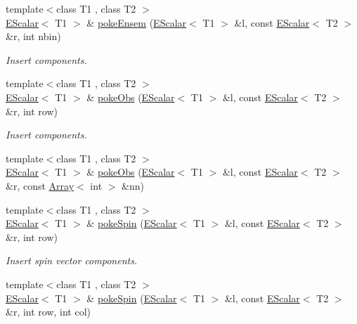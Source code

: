 \begin{DoxyCompactItemize}
\item 
{\footnotesize template$<$class T1 , class T2 $>$ }\\\mbox{\hyperlink{classENSEM_1_1EScalar}{E\+Scalar}}$<$ T1 $>$ \& \mbox{\hyperlink{group__escalar_ga9528137f2a0461bf8dc2e6825f00464f}{poke\+Ensem}} (\mbox{\hyperlink{classENSEM_1_1EScalar}{E\+Scalar}}$<$ T1 $>$ \&l, const \mbox{\hyperlink{classENSEM_1_1EScalar}{E\+Scalar}}$<$ T2 $>$ \&r, int nbin)
\begin{DoxyCompactList}\small\item\em Insert components. \end{DoxyCompactList}\item 
{\footnotesize template$<$class T1 , class T2 $>$ }\\\mbox{\hyperlink{classENSEM_1_1EScalar}{E\+Scalar}}$<$ T1 $>$ \& \mbox{\hyperlink{group__escalar_ga635de79045bc1565a78ea94b9ff967fb}{poke\+Obs}} (\mbox{\hyperlink{classENSEM_1_1EScalar}{E\+Scalar}}$<$ T1 $>$ \&l, const \mbox{\hyperlink{classENSEM_1_1EScalar}{E\+Scalar}}$<$ T2 $>$ \&r, int row)
\begin{DoxyCompactList}\small\item\em Insert components. \end{DoxyCompactList}\item 
{\footnotesize template$<$class T1 , class T2 $>$ }\\\mbox{\hyperlink{classENSEM_1_1EScalar}{E\+Scalar}}$<$ T1 $>$ \& \mbox{\hyperlink{group__escalar_gad25640d827b75330c6d3f288290866fd}{poke\+Obs}} (\mbox{\hyperlink{classENSEM_1_1EScalar}{E\+Scalar}}$<$ T1 $>$ \&l, const \mbox{\hyperlink{classENSEM_1_1EScalar}{E\+Scalar}}$<$ T2 $>$ \&r, const \mbox{\hyperlink{classXMLArray_1_1Array}{Array}}$<$ int $>$ \&nn)
\item 
{\footnotesize template$<$class T1 , class T2 $>$ }\\\mbox{\hyperlink{classENSEM_1_1EScalar}{E\+Scalar}}$<$ T1 $>$ \& \mbox{\hyperlink{group__escalar_gae8b2f2d3c5fedfb458392f11d78f2c88}{poke\+Spin}} (\mbox{\hyperlink{classENSEM_1_1EScalar}{E\+Scalar}}$<$ T1 $>$ \&l, const \mbox{\hyperlink{classENSEM_1_1EScalar}{E\+Scalar}}$<$ T2 $>$ \&r, int row)
\begin{DoxyCompactList}\small\item\em Insert spin vector components. \end{DoxyCompactList}\item 
{\footnotesize template$<$class T1 , class T2 $>$ }\\\mbox{\hyperlink{classENSEM_1_1EScalar}{E\+Scalar}}$<$ T1 $>$ \& \mbox{\hyperlink{group__escalar_ga7f41ec60f3cfb7ed2f965af5b8a81132}{poke\+Spin}} (\mbox{\hyperlink{classENSEM_1_1EScalar}{E\+Scalar}}$<$ T1 $>$ \&l, const \mbox{\hyperlink{classENSEM_1_1EScalar}{E\+Scalar}}$<$ T2 $>$ \&r, int row, int col)

\end{DoxyCompactItemize}
